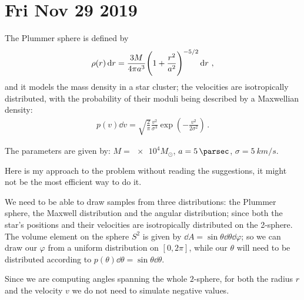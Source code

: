 \documentclass[main.tex]{subfiles}
\begin{document}
\section*{Fri Nov 29 2019}

The Plummer sphere is defined by 
%
\begin{align}
  \rho (r) \dd{r} = \frac{3M}{4 \pi a^3} \qty(1 + \frac{r^2}{a^2})^{-5/2} \dd{r}
\,,
\end{align}
%
and it models the mass density in a star cluster; the velocities are isotropically distributed, with the probability of their moduli being described by a Maxwellian density: 
%
\begin{align}
  p(v) \dd{v} = \sqrt{\frac{2}{\pi }} \frac{v^2}{\sigma^3}
  \exp( -\frac{v^2}{2 \sigma^2})
\,.
\end{align}

The parameters are given by: \(M = \num{e4} M_{\odot}\), \(a = \SI{5}{\parsec}\), \(\sigma = \SI{5}{km/s}\).

Here is my approach to the problem without reading the suggestions, it might not be the most efficient way to do it. 

We need to be able to draw samples from three distributions: the Plummer sphere, the Maxwell distribution and the angular distribution; since both the star's positions and their velocities are isotropically distributed on the 2-sphere. 
The volume element on the sphere \(S^{2}\) is given by \(\dd{A} = \sin \theta \dd{\theta } \dd{\varphi }\); so we can draw our \(\varphi \) from a uniform distribution on \([0, 2 \pi ]\), while our \(\theta \) will need to be distributed according to \(p(\theta ) \dd{\theta }= \sin \theta \dd{\theta }  \). 

Since we are computing angles spanning the whole \(2\)-sphere, for both the radius \(r\) and the velocity \(v\) we do not need to simulate negative values.


 
\end{document}
